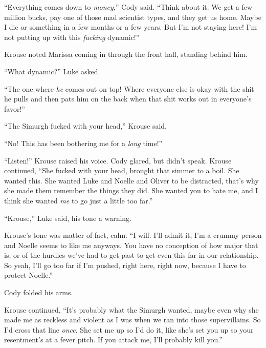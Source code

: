 ``Everything comes down to \emph{money},'' Cody said.  ``Think about it.  We get a few million bucks, pay one of those mad scientist types, and they get us home.  Maybe I die or something in a few months or a few years.  But I'm not staying here!  I'm not putting up with this \emph{fucking} dynamic!''



Krouse noted Marissa coming in through the front hall, standing behind him.



``What dynamic?'' Luke asked.



``The one where \emph{he} comes out on top!  Where everyone else is okay with the shit he pulls and then pats him on the back when that shit works out in everyone's favor!''



``The Simurgh fucked with your head,'' Krouse said.



``No!  This has been bothering me for a \emph{long} time!''



``Listen!'' Krouse raised his voice.  Cody glared, but didn't speak.  Krouse continued, ``She fucked with your head, brought that simmer to a boil.  She wanted this.  She wanted Luke and Noelle and Oliver to be distracted, that's why she made them remember the things they did.  She wanted you to hate me, and I think she wanted\emph{ me} to go just a little too far.''



``Krouse,'' Luke said, his tone a warning.



Krouse's tone was matter of fact, calm.  ``I will.  I'll admit it, I'm a crummy person and Noelle seems to like me anyways.  You have no conception of how major that is, or of the hurdles we've had to get past to get even this far in our relationship.  So yeah, I'll go too far if I'm pushed, right here, right now, because I have to protect Noelle.''



Cody folded his arms.



Krouse continued, ``It's probably what the Simurgh wanted, maybe even why she made me as reckless and violent as I was when we ran into those supervillains.  So I'd cross that line \emph{once}.  She set me up so I'd do it, like she's set you up so your resentment's at a fever pitch.  If you attack me, I'll probably kill you.''




